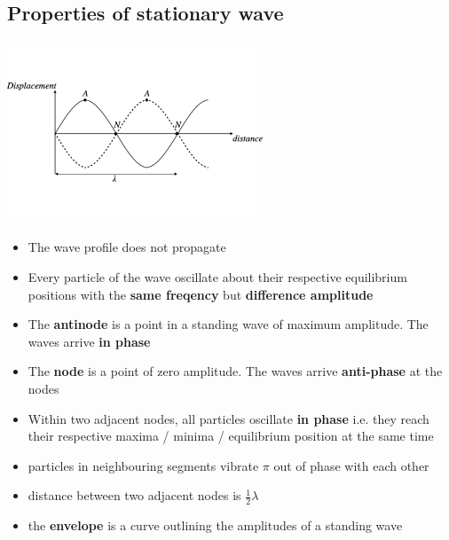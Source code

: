 \documentclass[a4paper, 10pt]{article}
\begin{document}
\subsection{Properties of stationary wave}
\begin{center}
\includegraphics[trim = 50 50 50 50, width=3in]{figures/1.pdf} 
\end{center}	
\begin{itemize}
   \item The wave profile does not propagate
   \item Every particle of the wave oscillate about their respective equilibrium positions with the \textbf{same freqency} but \textbf{difference amplitude}
   \item The \textbf{antinode} is a point in a standing wave of maximum amplitude. The waves arrive \textbf{in phase}
   \item The \textbf{node} is a point of zero amplitude. The waves arrive \textbf{anti-phase} at the nodes
   \item Within two adjacent nodes, all particles oscillate \textbf{in phase} i.e. they reach their respective maxima / minima / equilibrium position at the same time
   \item particles in neighbouring segments vibrate $\pi$ out of phase with each other 
   \item distance between two adjacent nodes is \textbf{$\frac{1}{2}\lambda$}
   \item the \textbf{envelope} is a curve outlining the amplitudes of a standing wave

\end{itemize}	
\end{document}
